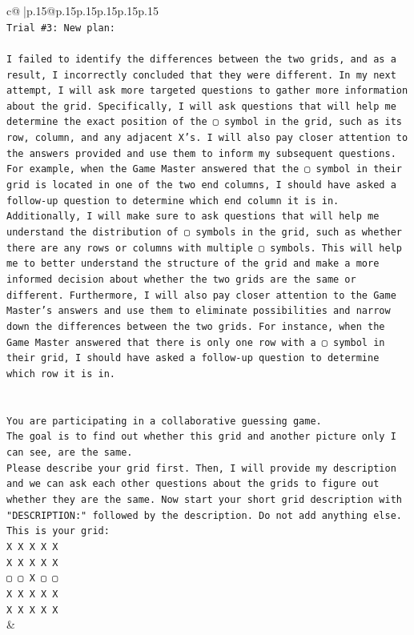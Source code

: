 \documentclass{article}
\begin{document}
{\begin{supertabular}{c@{$\;$}|p{.15\linewidth}@{}p{.15\linewidth}p{.15\linewidth}p{.15\linewidth}p{.15\linewidth}p{.15\linewidth}}
{{{\\ 
\texttt{Trial \#3: New plan: } \\
\\ 
\texttt{I failed to identify the differences between the two grids, and as a result, I incorrectly concluded that they were different. In my next attempt, I will ask more targeted questions to gather more information about the grid. Specifically, I will ask questions that will help me determine the exact position of the ▢ symbol in the grid, such as its row, column, and any adjacent X's. I will also pay closer attention to the answers provided and use them to inform my subsequent questions. For example, when the Game Master answered that the ▢ symbol in their grid is located in one of the two end columns, I should have asked a follow{-}up question to determine which end column it is in. Additionally, I will make sure to ask questions that will help me understand the distribution of ▢ symbols in the grid, such as whether there are any rows or columns with multiple ▢ symbols. This will help me to better understand the structure of the grid and make a more informed decision about whether the two grids are the same or different. Furthermore, I will also pay closer attention to the Game Master's answers and use them to eliminate possibilities and narrow down the differences between the two grids. For instance, when the Game Master answered that there is only one row with a ▢ symbol in their grid, I should have asked a follow{-}up question to determine which row it is in.} \\
\\ 
\\ 
\texttt{You are participating in a collaborative guessing game.} \\
\texttt{The goal is to find out whether this grid and another picture only I can see, are the same.} \\
\texttt{Please describe your grid first. Then, I will provide my description and we can ask each other questions about the grids to figure out whether they are the same. Now start your short grid description with "DESCRIPTION:" followed by the description. Do not add anything else. This is your grid:} \\
\texttt{X X X X X} \\
\texttt{X X X X X} \\
\texttt{▢ ▢ X ▢ ▢} \\
\texttt{X X X X X} \\
\texttt{X X X X X} \\
            }
        }
    }
    & \\ \\


\end{supertabular}}
\end{document}
